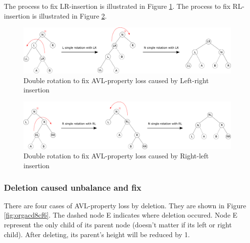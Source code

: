 \documentclass[11pt]{book}
\begin{document}
The process to fix LR-insertion is illustrated in Figure \ref{fig:org933a468}. The process to fix RL-insertion is illustrated in Figure \ref{fig:org6fc9e78}.

\begin{figure}[htbp]
\centering
\includegraphics[width=400pt]{./img/AVL-LR-insertion-fix.pdf}
\caption[Figure]{\label{fig:org933a468}
Double rotation to fix AVL-property loss caused by Left-right insertion}
\end{figure}

\begin{figure}[htbp]
\centering
\includegraphics[width=400pt]{./img/AVL-RL-insertion-fix.pdf}
\caption[Figure]{\label{fig:org6fc9e78}
Double rotation to fix AVL-property loss caused by Right-left insertion}
\end{figure}
\subsubsection{Deletion caused unbalance and fix}
\label{sec:org9ec0299}
There are four cases of AVL-property loss by deletion. They are shown in Figure \ref{fig:orgacd8cf6}. The dashed node E indicates where deletion occured. Node E represent the only child of its parent node (doesn't matter if its left or right child). After deleting, its parent's height will be reduced by 1.
\end{document}
